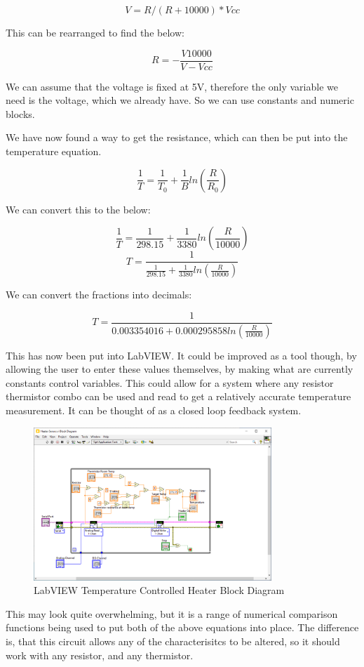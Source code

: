 \documentclass[a4paper,11pt]{report}
\begin{document}
\[V = R / (R + 10000) * Vcc\]

This can be rearranged to find the below:

\[R=-\frac{V10000}{V-Vcc}\]

We can assume that the voltage is fixed at 5V, therefore the only variable we need is the voltage, which we already have. So we can use constants and numeric blocks.

We have now found a way to get the resistance, which can then be put into the temperature equation.

\[\frac{1}{T} = \frac{1}{T_0} + \frac{1}{B}ln(\frac{R}{R_0})\]

We can convert this to the below:

\[\frac{1}{T} = \frac{1}{298.15} + \frac{1}{3380}ln(\frac{R}{10000})\]
\[T = \frac{1}{\frac{1}{298.15} + \frac{1}{3380}ln(\frac{R}{10000})}\]

We can convert the fractions into decimals:

\[T = \frac{1}{0.003354016 + 0.000295858ln(\frac{R}{10000})}\]

This has now been put into LabVIEW. It could be improved as a tool though, by allowing the user to enter these values themselves, by making what are currently constants control variables. This could allow for a system where any resistor thermistor combo can be used and read to get a relatively accurate temperature measurement. It can be thought of as a closed loop feedback system.

\begin{figure}[H]
\centering
\includegraphics[width=0.8\textwidth]{screenshots/labview45}
\caption{LabVIEW Temperature Controlled Heater Block Diagram}
\end{figure}

This may look quite overwhelming, but it is a range of numerical comparison functions being used to put both of the above equations into place. The difference is, that this circuit allows any of the characterisitcs to be altered, so it should work with any resistor, and any thermistor.
\end{document}
